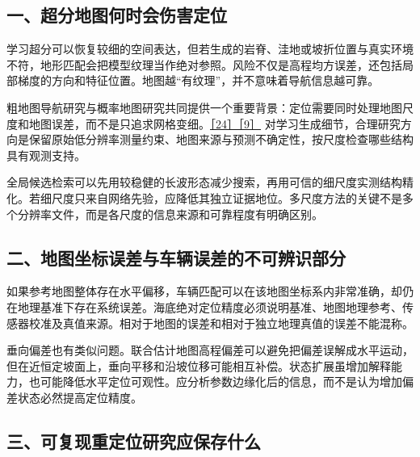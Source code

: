 \hypertarget{ux4e00ux8d85ux5206ux5730ux56feux4f55ux65f6ux4f1aux4f24ux5bb3ux5b9aux4f4d}{%
\subsection{一、超分地图何时会伤害定位}\label{ux4e00ux8d85ux5206ux5730ux56feux4f55ux65f6ux4f1aux4f24ux5bb3ux5b9aux4f4d}}

学习超分可以恢复较细的空间表达，但若生成的岩脊、洼地或坡折位置与真实环境不符，地形匹配会把模型纹理当作绝对参照。风险不仅是高程均方误差，还包括局部梯度的方向和特征位置。地图越``有纹理''，并不意味着导航信息越可靠。

粗地图导航研究与概率地图研究共同提供一个重要背景：定位需要同时处理地图尺度和地图误差，而不是只追求网格变细。\href{https://eprints.soton.ac.uk/480480/1/joe.pdf}{［24］}\href{https://arxiv.org/abs/2203.10893}{［9］} 对学习生成细节，合理研究方向是保留原始低分辨率测量约束、地图来源与预测不确定性，按尺度检查哪些结构具有观测支持。

全局候选检索可以先用较稳健的长波形态减少搜索，再用可信的细尺度实测结构精化。若细尺度只来自网络先验，应降低其独立证据地位。多尺度方法的关键不是多个分辨率文件，而是各尺度的信息来源和可靠程度有明确区别。

\hypertarget{ux4e8cux5730ux56feux5750ux6807ux8befux5deeux4e0eux8f66ux8f86ux8befux5deeux7684ux4e0dux53efux8fa8ux8bc6ux90e8ux5206}{%
\subsection{二、地图坐标误差与车辆误差的不可辨识部分}\label{ux4e8cux5730ux56feux5750ux6807ux8befux5deeux4e0eux8f66ux8f86ux8befux5deeux7684ux4e0dux53efux8fa8ux8bc6ux90e8ux5206}}

如果参考地图整体存在水平偏移，车辆匹配可以在该地图坐标系内非常准确，却仍在地理基准下存在系统误差。海底绝对定位精度必须说明基准、地图地理参考、传感器校准及真值来源。相对于地图的误差和相对于独立地理真值的误差不能混称。

垂向偏差也有类似问题。联合估计地图高程偏差可以避免把偏差误解成水平运动，但在近恒定坡面上，垂向平移和沿坡位移可能相互补偿。状态扩展虽增加解释能力，也可能降低水平定位可观性。应分析参数边缘化后的信息，而不是认为增加偏差状态必然提高定位精度。

\hypertarget{ux4e09ux53efux590dux73b0ux91cdux5b9aux4f4dux7814ux7a76ux5e94ux4fddux5b58ux4ec0ux4e48}{%
\subsection{三、可复现重定位研究应保存什么}\label{ux4e09ux53efux590dux73b0ux91cdux5b9aux4f4dux7814ux7a76ux5e94ux4fddux5b58ux4ec0ux4e48}}

